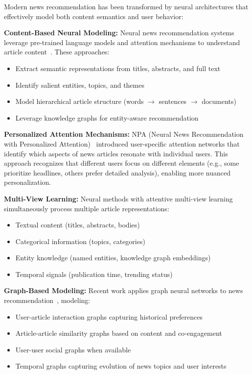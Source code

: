 Modern news recommendation has been transformed by neural architectures that effectively model both content semantics and user behavior:

\textbf{Content-Based Neural Modeling:} Neural news recommendation systems leverage pre-trained language models and attention mechanisms to understand article content~\cite{wu2019neural, wu2021empowering}. These approaches:
\begin{itemize}
    \item Extract semantic representations from titles, abstracts, and full text
    \item Identify salient entities, topics, and themes
    \item Model hierarchical article structure (words $\rightarrow$ sentences $\rightarrow$ documents)
    \item Leverage knowledge graphs for entity-aware recommendation
\end{itemize}

\textbf{Personalized Attention Mechanisms:} NPA (Neural News Recommendation with Personalized Attention)~\cite{wu2019npa} introduced user-specific attention networks that identify which aspects of news articles resonate with individual users. This approach recognizes that different users focus on different elements (e.g., some prioritize headlines, others prefer detailed analysis), enabling more nuanced personalization.

\textbf{Multi-View Learning:} Neural methods with attentive multi-view learning~\cite{wu2019neural} simultaneously process multiple article representations:
\begin{itemize}
    \item Textual content (titles, abstracts, bodies)
    \item Categorical information (topics, categories)
    \item Entity knowledge (named entities, knowledge graph embeddings)
    \item Temporal signals (publication time, trending status)
\end{itemize}

\textbf{Graph-Based Modeling:} Recent work applies graph neural networks to news recommendation~\cite{hu2020graph}, modeling:
\begin{itemize}
    \item User-article interaction graphs capturing historical preferences
    \item Article-article similarity graphs based on content and co-engagement
    \item User-user social graphs when available
    \item Temporal graphs capturing evolution of news topics and user interests
\end{itemize}

